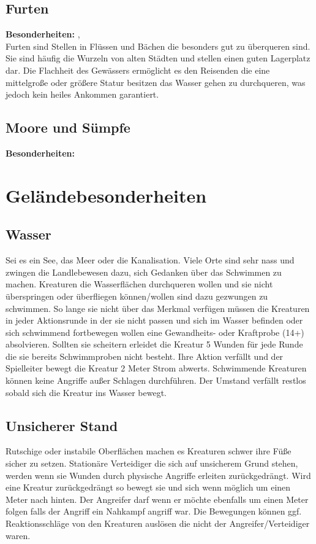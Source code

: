 \subsection*{Furten}
\textbf{Besonderheiten:} \textit{}, \textit{}\\
Furten sind Stellen in Flüssen und Bächen die besonders gut zu überqueren sind. Sie sind häufig die Wurzeln von alten Städten und stellen einen guten Lagerplatz dar. Die Flachheit des Gewässers ermöglicht es den Reisenden die eine mittelgroße oder größere Statur besitzen das Wasser gehen zu durchqueren, was jedoch kein heiles Ankommen garantiert. 

\subsection*{Moore und Sümpfe}
\textbf{Besonderheiten:} \textit{}

\section{Geländebesonderheiten} \label{geländebesonderheiten}

\subsection*{Wasser} \label{gb:wasser}
Sei es ein See, das Meer oder die Kanalisation. Viele Orte sind sehr nass und zwingen die Landlebewesen dazu, sich Gedanken über das Schwimmen zu machen. Kreaturen die Wasserflächen durchqueren wollen und sie nicht überspringen oder überfliegen können/wollen sind dazu gezwungen zu schwimmen. So lange sie nicht über das Merkmal \textit{} verfügen müssen die Kreaturen in jeder Aktionsrunde in der sie nicht passen und sich im Wasser befinden oder sich schwimmend fortbewegen wollen eine Gewandheits- oder Kraftprobe (14+) absolvieren. Sollten sie scheitern erleidet die Kreatur 5 Wunden für jede Runde die sie bereits Schwimmproben nicht besteht. Ihre Aktion verfällt und der Spielleiter bewegt die Kreatur 2 Meter Strom abwerts. Schwimmende Kreaturen können keine Angriffe außer Schlagen durchführen. Der Umstand \textit{} verfällt restlos sobald sich die Kreatur ins Wasser bewegt.

\subsection*{Unsicherer Stand} \label{gb:unsicher_stand}
Rutschige oder instabile Oberflächen machen es Kreaturen schwer ihre Füße sicher zu setzen. Stationäre Verteidiger die sich auf unsicherem Grund stehen, werden wenn sie Wunden durch physische Angriffe erleiten zurückgedrängt. Wird eine Kreatur zurückgedrängt so bewegt sie und sich wenn möglich um einen Meter nach hinten. Der Angreifer darf wenn er möchte ebenfalls um einen Meter folgen falls der Angriff ein Nahkampf angriff war. Die Bewegungen können ggf. Reaktionsschläge von den Kreaturen auslösen die nicht der Angreifer/Verteidiger waren.

